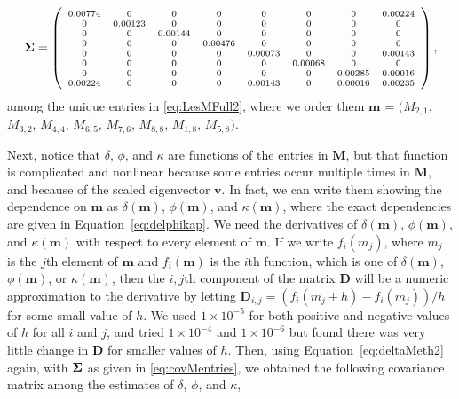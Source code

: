\documentclass[12pt, titlepage]{article}\usepackage[]{graphicx}\usepackage[]{color}
\def\bm{\mathbf{m}}
\def\bv{\mathbf{v}}
\def\bD{\mathbf{D}}
\def\bM{\mathbf{M}}
\def\bSigma{\mbox{\boldmath $\Sigma$}}
\begin{document}
\begin{equation} \label{eq:covMentries}
  \bSigma =
   \left( \mbox{\scriptsize$\begin{array}{cccccccc}
 0.00774 & 0 & 0 & 0 & 0 & 0 & 0 & 0.00224 \\ 
  0 & 0.00123 & 0 & 0 & 0 & 0 & 0 & 0 \\ 
  0 & 0 & 0.00144 & 0 & 0 & 0 & 0 & 0 \\ 
  0 & 0 & 0 & 0.00476 & 0 & 0 & 0 & 0 \\ 
  0 & 0 & 0 & 0 & 0.00073 & 0 & 0 & 0.00143 \\ 
  0 & 0 & 0 & 0 & 0 & 0.00068 & 0 & 0 \\ 
  0 & 0 & 0 & 0 & 0 & 0 & 0.00285 & 0.00016 \\ 
  0.00224 & 0 & 0 & 0 & 0.00143 & 0 & 0.00016 & 0.00235 \\ 
  
  \end{array} $} \right),
\end{equation}
among the unique entries in \ref{eq:LesMFull2}, where we order them $\bm$ = $(M_{2,1}$, $M_{3,2}$, $M_{4,4}$, $M_{6,5}$, $M_{7,6}$, $M_{8,8}$, $M_{1,8}$, $M_{5,8})$.

Next, notice that $\delta$, $\phi$, and $\kappa$ are functions of the entries in $\bM$, but that function is complicated and nonlinear because some entries occur multiple times in $\bM$, and because of the scaled eigenvector $\bv$. In fact, we can write them showing the dependence on $\bm$ as $\delta(\bm)$, $\phi(\bm)$, and $\kappa(\bm)$, where the exact dependencies are given in Equation~\ref{eq:delphikap}. We need the derivatives of $\delta(\bm)$, $\phi(\bm)$, and $\kappa(\bm)$ with respect to every element of $\bm$.  If we write $f_i(m_j)$, where $m_j$ is the $j$th element of $\bm$ and $f_i(\bm)$ is the $i$th function, which is one of $\delta(\bm)$, $\phi(\bm)$, or $\kappa(\bm)$, then the $i,j$th component of the matrix $\bD$ will be a numeric approximation to the derivative by letting $\bD_{i,j} = (f_i(m_j + h) - f_i(m_j))/h$ for some small value of $h$.  We used $1 \times 10^{-5}$ for both positive and negative values of $h$ for all $i$ and $j$, and tried $1 \times 10^{-4}$ and $1 \times 10^{-6}$ but found there was very little change in $\bD$ for smaller values of $h$.  Then, using Equation~\ref{eq:deltaMeth2} again, with $\bSigma$ as given in \ref{eq:covMentries}, we obtained the following covariance matrix among the estimates of $\delta$, $\phi$, and $\kappa$,
\end{document}
